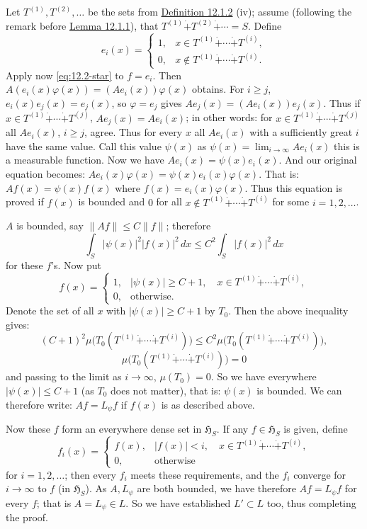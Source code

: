 \documentclass[12pt,b5paper,twoside]{article}
\newcommand{\Hspace}{\mathfrak H}
\newcommand{\defref}[1]{\hyperref[def:#1]{Definition #1}}
\newcommand{\lemref}[1]{\hyperref[lem:#1]{Lemma #1}}
\begin{document}
Let $T^{(1)},T^{(2)},\ldots$ be the sets from \defref{12.1.2} (iv); assume
(following the remark before \lemref{12.1.1}), that
$T^{(1)}\mathbin{\dot+}T^{(2)}\mathbin{\dot+}\cdots=S$. Define
\[
 e_i(x)=\begin{cases}
  1,&x\in T^{(1)}\mathbin{\dot+}\cdots\mathbin{\dot+}T^{(i)},\\
  0,&x\notin T^{(1)}\mathbin{\dot+}\cdots\mathbin{\dot+}T^{(i)}.
 \end{cases}
\]
Apply now \eqref{eq:12.2-star} to $f=e_i$. Then
$A(e_i(x)\varphi(x))=(Ae_i(x))\varphi(x)$ obtains. For $i\geq j$,
$e_i(x)e_j(x)=e_j(x)$, so $\varphi=e_j$ gives
$Ae_j(x)=(Ae_i(x))e_j(x)$. Thus if
$x\in T^{(1)}\mathbin{\dot+}\cdots\mathbin{\dot+}T^{(j)}$,
$Ae_j(x)=Ae_i(x)$; in other words: for
$x\in T^{(1)}\mathbin{\dot+}\cdots\mathbin{\dot+}T^{(j)}$ all $Ae_i(x)$,
$i\geq j$, agree. Thus for every $x$ all $Ae_i(x)$ with a sufficiently great
$i$ have the same value. Call this value $\psi(x)$ as
$\psi(x)=\lim_{i\to\infty}Ae_i(x)$ this is a measurable function. Now we have
$Ae_i(x)=\psi(x)e_i(x)$. And our original equation becomes:
$Ae_i(x)\varphi(x)=\psi(x)e_i(x)\varphi(x)$. That is:
$Af(x)=\psi(x)f(x)$ where $f(x)=e_i(x)\varphi(x)$. Thus this equation is
proved if $f(x)$ is bounded and $0$ for all
$x\notin T^{(1)}\mathbin{\dot+}\cdots\mathbin{\dot+}T^{(i)}$ for some
$i=1,2,\ldots$.

$A$ is bounded, say $\lVert Af\rVert\leq C\lVert f\rVert$; therefore
\[
 \int_S|\psi(x)|^2|f(x)|^2\,dx
 \leq C^2\int_S|f(x)|^2\,dx
\]
for these $f$'s. Now put
\[
 f(x)=\begin{cases}
  1,&|\psi(x)|\geq C+1,\quad
    x\in T^{(1)}\mathbin{\dot+}\cdots\mathbin{\dot+}T^{(i)},\\
  0,&\text{otherwise}.
 \end{cases}
\]
Denote the set of all $x$ with $|\psi(x)|\geq C+1$ by $T_0$. Then the above
inequality gives:
\[
 (C+1)^2\mu\bigl(T_0(T^{(1)}\mathbin{\dot+}\cdots
 \mathbin{\dot+}T^{(i)})\bigr)
 \leq C^2\mu\bigl(T_0(T^{(1)}\mathbin{\dot+}\cdots
 \mathbin{\dot+}T^{(i)})\bigr),
\]
\[
 \mu\bigl(T_0(T^{(1)}\mathbin{\dot+}\cdots
 \mathbin{\dot+}T^{(i)})\bigr)=0
\]
and passing to the limit as $i\to\infty$, $\mu(T_0)=0$. So we have everywhere
$|\psi(x)|\leq C+1$ (as $T_0$ does not matter), that is: $\psi(x)$ is
bounded. We can therefore write: $Af=L_\psi f$ if $f(x)$ is as described
above.

Now these $f$ form an everywhere dense set in $\Hspace_S$. If any
$f\in\Hspace_S$ is given, define
\[
 f_i(x)=\begin{cases}
  f(x),&|f(x)|<i,\quad
  x\in T^{(1)}\mathbin{\dot+}\cdots\mathbin{\dot+}T^{(i)},\\
  0,&\text{otherwise}
 \end{cases}
\]
for $i=1,2,\ldots$; then every $f_i$ meets these requirements, and the $f_i$
converge for $i\to\infty$ to $f$ (in $\Hspace_S$). As $A,L_\psi$ are both
bounded, we have therefore $Af=L_\psi f$ for every $f$; that is
$A=L_\psi\in L$. So we have established $L'\subset L$ too, thus completing
the proof.
\end{document}
